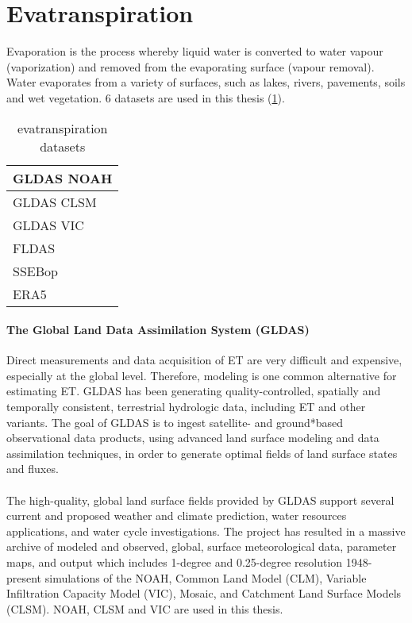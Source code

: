 \section{Evatranspiration}
Evaporation is the process whereby liquid water is converted to water vapour (vaporization) and removed from the evaporating surface (vapour removal). Water evaporates from a variety of surfaces, such as lakes, rivers, pavements, soils and wet vegetation. 6 datasets are used in this thesis (\ref{tab:et}). 
\begin{table}[htbp]\centering
	\begin{tabular}{|l|}
		\hline
		GLDAS NOAH\\ \hline
		GLDAS CLSM\\ \hline
		GLDAS VIC\\ \hline
		FLDAS\\ \hline
		SSEBop\\ \hline
		ERA5\\ \hline
	\end{tabular}
	\label{tab:et}
	\caption{evatranspiration datasets}
\end{table}
\paragraph{The Global Land Data Assimilation System (GLDAS)}
Direct measurements and data acquisition of ET are very difficult and expensive, especially at the global level. Therefore, modeling is one common alternative for estimating ET. GLDAS has been generating quality-controlled, spatially and temporally consistent, terrestrial hydrologic data, including ET and other variants. The goal of GLDAS is to ingest satellite- and ground*based observational data products, using advanced land surface modeling and data assimilation techniques, in order to generate optimal fields of land surface states and fluxes.\\\\
The high-quality, global land surface fields provided by GLDAS support several current and proposed weather and climate prediction, water resources applications, and water cycle investigations. The project has resulted in a massive archive of modeled and observed, global, surface meteorological data, parameter maps, and output which includes 1-degree and 0.25-degree resolution 1948-present simulations of the NOAH, Common Land Model (CLM), Variable Infiltration Capacity Model (VIC), Mosaic, and Catchment Land Surface Models (CLSM). NOAH, CLSM and VIC are used in this thesis. 
